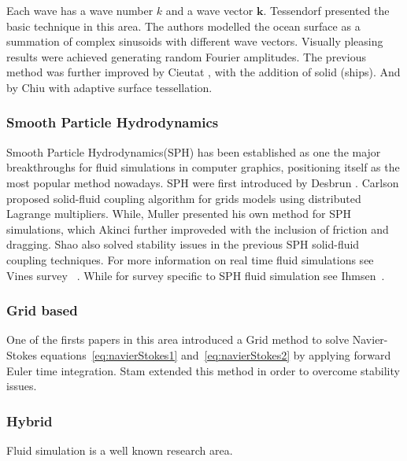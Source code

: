 \documentclass[11pt]{report}
\begin{document}
Each wave has a wave number $k$ and a wave vector $\mathbf{k}$.
Tessendorf \cite{Tessendorf2001} presented the basic technique in this area.
The authors modelled the ocean surface as a summation of complex sinusoids with different wave vectors.
Visually pleasing results were achieved generating random Fourier amplitudes.
The previous method was further improved by Cieutat \cite{Cieutat2003}, with the addition of solid (ships).
And by Chiu \cite{Chiu2006} with adaptive surface tessellation.


\subsubsection{Smooth Particle Hydrodynamics}

Smooth Particle Hydrodynamics(SPH) has been established as one the major breakthroughs for fluid simulations in computer graphics, positioning itself as the most popular method nowadays.
SPH were first introduced by Desbrun \cite{DesbrunMathieuandGascuel1996}.
Carlson \cite{Carlson2004} proposed solid-fluid coupling algorithm for grids models using distributed Lagrange multipliers.
While, Muller \cite{Muller2004} presented his own method for SPH simulations, which Akinci \cite{Akinci2012} further improveded with the inclusion of friction and dragging. 
Shao \cite{Shao2014} also solved stability issues in the previous SPH solid-fluid coupling techniques.
For more information on real time fluid simulations see Vines survey ~\cite{Vines2012}.
While for survey specific to SPH fluid simulation see Ihmsen~\cite{Ihmsen2014}.

\subsubsection{Grid based}

One of the firsts papers in this area introduced a Grid method \cite{Foster1996} to solve Navier-Stokes equations~\ref{eq:navierStokes1} and~\ref{eq:navierStokes2} by applying forward Euler time integration. 
Stam \cite{Stam1999} extended this method in order to overcome stability issues.


\subsubsection{Hybrid}

Fluid simulation is a well known research area. 
\end{document}
